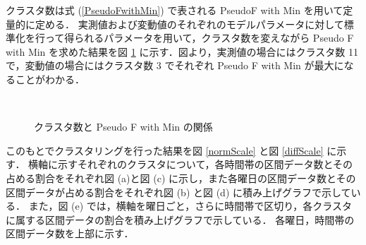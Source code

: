 \documentclass[a4j]{jarticle}
\begin{document}
クラスタ数は式 (\ref{PseudoFwithMin}) で表される PseudoF with Min を用いて定量的に定める．
実測値および変動値のそれぞれのモデルパラメータに対して標準化を行って得られるパラメータを用いて，クラスタ数を変えながら Pseudo F with Min を求めた結果を図 \ref{PseudoFwithMinPlotScale} に示す．図より，実測値の場合にはクラスタ数 11 で，変動値の場合にはクラスタ数 3 でそれぞれ Pseudo F with Min が最大になることがわかる．
\begin{figure}[tb]
\begin{center}
~
\caption{クラスタ数と Pseudo F with Min の関係}
\label{PseudoFwithMinPlotScale}
\end{center}
\end{figure} 

このもとでクラスタリングを行った結果を図 \ref{normScale} と図 \ref{diffScale} に示す．
横軸に示すそれぞれのクラスタについて，各時間帯の区間データ数とその占める割合をそれぞれ図 (a)と図 (c) に示し，また各曜日の区間データ数とその区間データが占める割合をそれぞれ図 (b) と図 (d) に積み上げグラフで示している．
また，図 (e) では，横軸を曜日ごと，さらに時間帯で区切り，各クラスタに属する区間データの割合を積み上げグラフで示している．
各曜日，時間帯の区間データ数を上部に示す．
\end{document}

